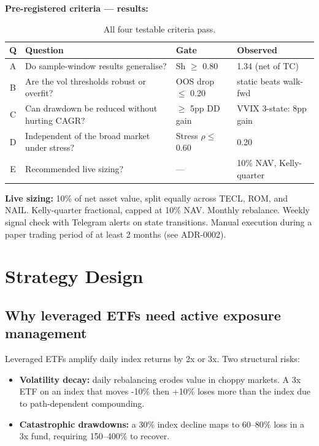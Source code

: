 \documentclass[11pt,a4paper]{article}
\begin{document}
\textbf{Pre-registered criteria --- results:}
\begin{table}[H]
\centering
\small
\begin{tabular}{clll}
\toprule
\textbf{Q} & \textbf{Question} & \textbf{Gate} & \textbf{Observed} \\
\midrule
A & Do sample-window results generalise?          & Sh $\geq$ 0.80         & 1.34 (net of TC) \\
B & Are the vol thresholds robust or overfit?     & OOS drop $\leq$ 0.20   & static beats walk-fwd \\
C & Can drawdown be reduced without hurting CAGR? & $\geq$ 5pp DD gain     & VVIX 3-state: 8pp gain \\
D & Independent of the broad market under stress? & Stress $\rho \leq$ 0.60 & 0.20 \\
E & Recommended live sizing?                      & ---                    & 10\% NAV, Kelly-quarter \\
\bottomrule
\end{tabular}
\caption{All four testable criteria pass.}
\end{table}

\textbf{Live sizing:} 10\% of net asset value, split equally across TECL, ROM, and NAIL. Kelly-quarter fractional, capped at 10\% NAV. Monthly rebalance. Weekly signal check with Telegram alerts on state transitions. Manual execution during a paper trading period of at least 2 months (see ADR-0002).

\section{Strategy Design}

\subsection{Why leveraged ETFs need active exposure management}

Leveraged ETFs amplify daily index returns by 2x or 3x. Two structural risks:
\begin{itemize}[noitemsep]
    \item \textbf{Volatility decay:} daily rebalancing erodes value in choppy markets. A 3x ETF on an index that moves -10\% then +10\% loses more than the index due to path-dependent compounding.
    \item \textbf{Catastrophic drawdowns:} a 30\% index decline maps to 60--80\% loss in a 3x fund, requiring 150--400\% to recover.
\end{itemize}
\end{document}
